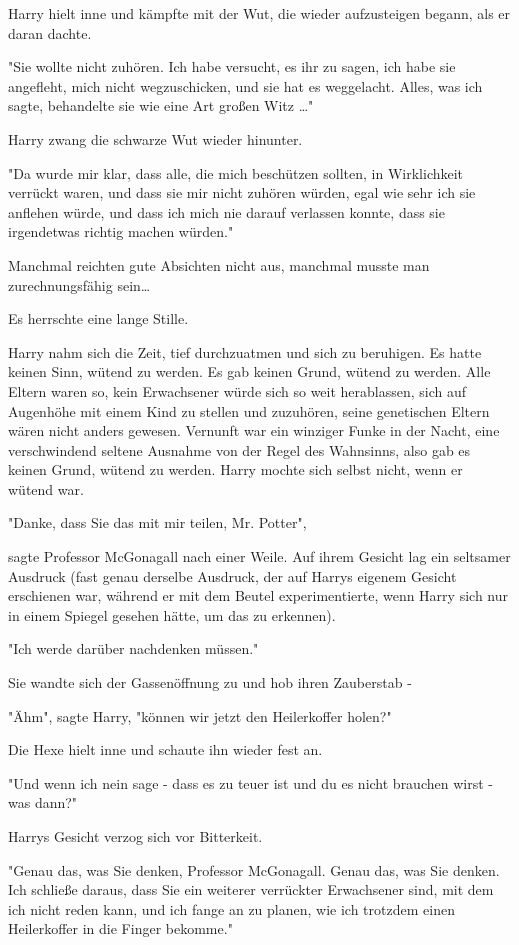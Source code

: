 {Harry hielt inne und kämpfte mit der Wut, die wieder aufzusteigen begann, als er daran dachte.

"Sie wollte nicht zuhören. Ich habe versucht, es ihr zu sagen, ich habe sie angefleht, mich nicht wegzuschicken, und sie hat es weggelacht. Alles, was ich sagte, behandelte sie wie eine Art großen Witz …"

Harry zwang die schwarze Wut wieder hinunter.

"Da wurde mir klar, dass alle, die mich beschützen sollten, in Wirklichkeit verrückt waren, und dass sie mir nicht zuhören würden, egal wie sehr ich sie anflehen würde, und dass ich mich nie darauf verlassen konnte, dass sie irgendetwas richtig machen würden."

Manchmal reichten gute Absichten nicht aus, manchmal musste man zurechnungsfähig sein…

Es herrschte eine lange Stille.

Harry nahm sich die Zeit, tief durchzuatmen und sich zu beruhigen. Es hatte keinen Sinn, wütend zu werden. Es gab keinen Grund, wütend zu werden. Alle Eltern waren so, kein Erwachsener würde sich so weit herablassen, sich auf Augenhöhe mit einem Kind zu stellen und zuzuhören, seine genetischen Eltern wären nicht anders gewesen. Vernunft war ein winziger Funke in der Nacht, eine verschwindend seltene Ausnahme von der Regel des Wahnsinns, also gab es keinen Grund, wütend zu werden. Harry mochte sich selbst nicht, wenn er wütend war.

"Danke, dass Sie das mit mir teilen, Mr. Potter",

sagte Professor McGonagall nach einer Weile. Auf ihrem Gesicht lag ein seltsamer Ausdruck (fast genau derselbe Ausdruck, der auf Harrys eigenem Gesicht erschienen war, während er mit dem Beutel experimentierte, wenn Harry sich nur in einem Spiegel gesehen hätte, um das zu erkennen).

"Ich werde darüber nachdenken müssen."

Sie wandte sich der Gassenöffnung zu und hob ihren Zauberstab -

"Ähm", sagte Harry, "können wir jetzt den Heilerkoffer holen?"

Die Hexe hielt inne und schaute ihn wieder fest an.

"Und wenn ich nein sage - dass es zu teuer ist und du es nicht brauchen wirst - was dann?"

Harrys Gesicht verzog sich vor Bitterkeit.

"Genau das, was Sie denken, Professor McGonagall. Genau das, was Sie denken. Ich schließe daraus, dass Sie ein weiterer verrückter Erwachsener sind, mit dem ich nicht reden kann, und ich fange an zu planen, wie ich trotzdem einen Heilerkoffer in die Finger bekomme."

}
